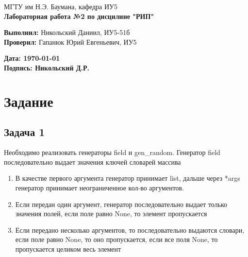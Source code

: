 \documentclass{article}
\begin{document}
\begin{titlepage}
    \begin{center}
        \normalsize
        МГТУ им Н.Э. Баумана, кафедра ИУ5 \\
        \vspace*{1cm}
        \LARGE
        \textbf{Лабораторная работа №2 по дисцилине "РИП"}

        \vspace{0.5cm}
    \end{center}
    \vfill

    \begin{flushright}
        \textbf{Выполнил:} Никольский Даниил, ИУ5-51б \\
        \textbf{Проверил:} Гапанюк Юрий Евгеньевич, ИУ5 \\
    \end{flushright}
    \vspace{1.5cm}
    \begin{flushleft}
        \textbf{Дата: \today} \\
        \textbf{Подпись: Никольский Д.Р.} \\
    \end{flushleft}
\end{titlepage}

\tableofcontents
\newpage

\section{Задание}
\subsection{Задача 1}
Необходимо реализовать генераторы field и gen\_random. Генератор field последовательно выдает значения ключей словарей массива

\begin{enumerate}
    \item В качестве первого аргумента генератор принимает list, дальше через *args генератор принимает неограниченное кол-во аргументов.

    \item Если передан один аргумент, генератор последовательно выдает только значения полей, если поле равно None, то элемент пропускается

    \item Если передано несколько аргументов, то последовательно выдаются словари, если поле равно None, то оно пропускается, если все поля None, то пропускается целиком весь элемент

\end{enumerate}
\end{document}
